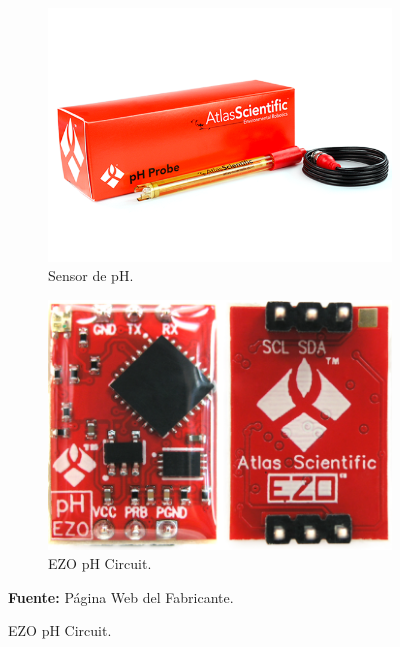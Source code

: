 \begin{figure}[H]
\caption[Sensor y EZO de pH.]{Sensor y EZO de pH de la empresa Atlas Scientific. }
     \centering
     \begin{subfigure}[b]{0.6\textwidth}
         \centering
         \includegraphics[width=\textwidth]{Imagenes/2021/imag23.png}
	    \caption[Sensor de pH.]{Sensor de pH. }
        \label{fig:sensorpH}
     \end{subfigure}
     \hfill
     \begin{subfigure}[b]{0.35\textwidth}
         \centering
         \includegraphics[width=\textwidth]{Imagenes/2021/imag27.png}
         \caption[EZO pH Circuit]{EZO pH Circuit.}
        \label{fig:EZOpH}
     \end{subfigure}
     {\textbf{Fuente:} P\'agina Web del Fabricante\cite{atlasph}.}
     \hfill
\end{figure}

